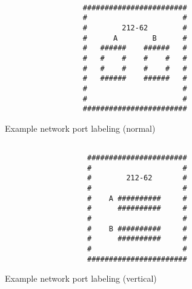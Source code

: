 \begin{multicols}{2}
	\begin{figure}[H]
		\centering

		\begin{verbatim}

			      ########################
			      #                      #
			      #        212-62        #
			      #      A        B      #
			      #   ######    ######   #
			      #   #    #    #    #   #
			      #   #    #    #    #   #
			      #   ######    ######   #
			      #                      #
			      #                      #
			      ########################
		\end{verbatim}

		\caption{Example network port labeling (normal)}
	\end{figure}

	\begin{figure}[H]
		\centering

		\begin{verbatim}

			       #######################
			       #                     #
			       #        212-62       #
			       #                     #
			       #    A ##########     #
			       #      ##########     #
			       #                     #
			       #    B ##########     #
			       #      ##########     #
			       #                     #
			       #######################
		\end{verbatim}

		\caption{Example network port labeling (vertical)}
	\end{figure}
\end{multicols}
